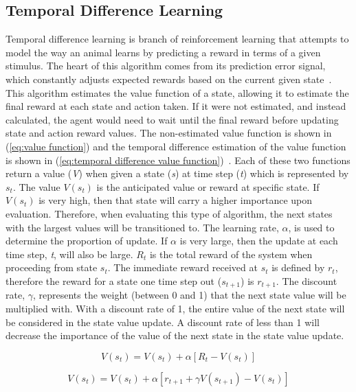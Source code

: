 \documentclass[12pt,american]{report}
\begin{document}
\subsection{Temporal Difference Learning}
Temporal difference learning is branch of reinforcement learning that attempts to model the way an animal learns by predicting a reward in terms of a given stimulus. The heart of this algorithm comes from its prediction error signal, which constantly adjusts expected rewards based on the current given state~\cite{o2003temporal}. This algorithm estimates the value function of a state, allowing it to estimate the final reward at each state and action taken.  If it were not estimated, and instead calculated, the agent would need to wait until the final reward before updating state and action reward values. The non-estimated value function is shown in (\ref{eq:value function}) and the temporal difference estimation of the value function is shown in (\ref{eq:temporal difference value function})~\cite{Eden}. Each of these two functions return a value (\textit{V}) when given a state (\textit{s}) at time step (\textit{t}) which is represented by \textit{$s_t$}. The value \textit{$V(s_t)$} is the anticipated value or reward at specific state.  If \textit{$V(s_t)$} is very high, then that state will carry a higher importance upon evaluation. Therefore, when evaluating this type of algorithm, the next states with the largest values will be transitioned to. The learning rate, \textit{$\alpha$}, is used to determine the proportion of update.  If \textit{$\alpha$} is very large, then the update at each time step, \textit{t}, will also be large.  \textit{$R_t$} is the total reward of the system when proceeding from state \textit{$s_t$}. The immediate reward received at \textit{$s_t$} is defined by \textit{$r_t$}, therefore the reward for a state one time step out (\textit{$s_{t+1}$}) is \textit{$r_{t+1}$}. The discount rate, \textit{$\gamma$}, represents the weight (between 0 and 1) that the next state value will be multiplied with.  With a discount rate of 1, the entire value of the next state will be considered in the state value update. A discount rate of less than 1 will decrease the importance of the value of the next state in the state value update.

        \begin{equation}
            \label{eq:value function}
            V(s_{t}) = V(s_{t}) + \alpha[R_{t}-V(s_{t})]
        \end{equation}

        \begin{equation}
            \label{eq:temporal difference value function}
            V(s_{t}) = V(s_{t}) + \alpha[r_{t+1} + \gamma V(s_{t+1})-V(s_{t})]
        \end{equation}
\end{document}
